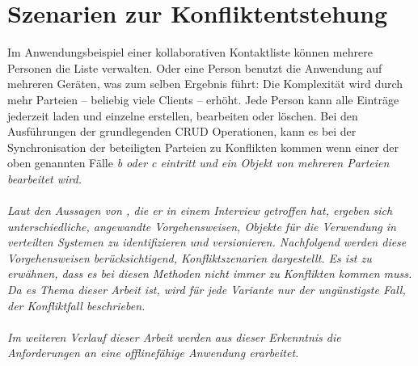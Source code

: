 \section{\label{chap:konfliktszenarien}Szenarien zur Konfliktentstehung}
Im Anwendungsbeispiel einer kollaborativen Kontaktliste können mehrere Personen die Liste verwalten. Oder eine Person benutzt die Anwendung auf mehreren Geräten, was zum selben Ergebnis führt:
Die Komplexität wird durch mehr Parteien -- beliebig viele Clients -- erhöht.
Jede Person kann alle Einträge jederzeit laden und einzelne erstellen, bearbeiten oder löschen. Bei den Ausführungen der grundlegenden \gls{CRUD} Operationen, kann es bei der Synchronisation der beteiligten Parteien zu Konflikten kommen wenn einer der oben genannten Fälle \it{b} oder \it{c} eintritt und ein Objekt von mehreren Parteien bearbeitet wird.\\\\
Laut den Aussagen von , die er in einem Interview getroffen hat, ergeben sich unterschiedliche, angewandte Vorgehensweisen, Objekte für die Verwendung in verteilten Systemen zu identifizieren und versionieren.
Nachfolgend werden diese Vorgehensweisen berücksichtigend, Konfliktszenarien dargestellt.
Es ist zu erwähnen, dass es bei diesen Methoden nicht immer zu Konflikten kommen muss.
Da es Thema dieser Arbeit ist, wird für jede Variante nur der ungünstigste Fall, der Konfliktfall beschrieben.
%
\\\\
Im weiteren Verlauf dieser Arbeit werden aus dieser Erkenntnis die Anforderungen an eine offlinefähige Anwendung erarbeitet.